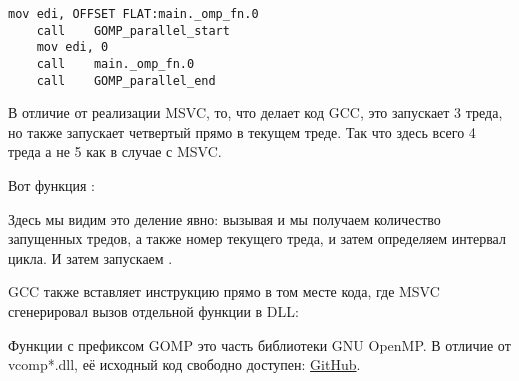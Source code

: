 \begin{lstlisting}[caption=GCC 4.8.1,style=customasmx86]
	mov	edi, OFFSET FLAT:main._omp_fn.0
	call	GOMP_parallel_start
	mov	edi, 0
	call	main._omp_fn.0
	call	GOMP_parallel_end
\end{lstlisting}

В отличие от реализации MSVC, то, что делает код GCC, это запускает 3 треда, но также запускает 
четвертый прямо в текущем треде. Так что здесь всего 4 треда а не 5 как в случае
с MSVC.

Вот функция :
 


Здесь мы видим это деление явно: вызывая 
 и 
мы получаем количество запущенных тредов, а также номер текущего треда, и затем определяем интервал цикла.
И затем запускаем .

GCC также вставляет инструкцию  
прямо в том месте кода, где MSVC сгенерировал вызов отдельной функции в DLL:



Функции с префиксом GOMP это часть библиотеки 
GNU OpenMP.
В отличие от vcomp*.dll, её исходный код свободно доступен: 
\href{http://go.yurichev.com/17102}{GitHub}.

